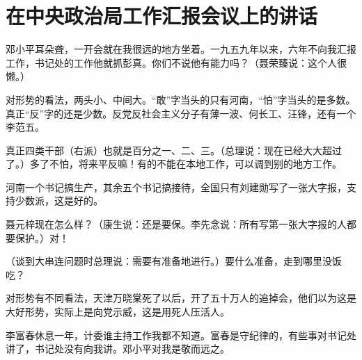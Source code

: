 \section[在中央政治局工作汇报会议上的讲话（一九六六年十月）]{在中央政治局工作汇报会议上的讲话}


邓小平耳朵聋，一开会就在我很远的地方坐着。一九五九年以来，六年不向我汇报工作，书记处的工作他就抓彭真。你们不说他有能力吗？（聂荣臻说：这个人很懒。）

对形势的看法，两头小、中间大。“敢”字当头的只有河南，“怕”字当头的是多数。真正“反”字的还是少数。反党反社会主义分子有薄一波、何长工、汪锋，还有一个李范五。

真正四类干部（右派）也就是百分之一、二、三。（总理说：现在已经大大超过了。）多了不怕，将来平反嘛！有的不能在本地工作，可以调到别的地方工作。

河南一个书记搞生产，其余五个书记搞接待，全国只有刘建勋写了一张大字报，支持少数派，这是好的。

聂元梓现在怎么样？（康生说：还是要保。李先念说：所有写第一张大字报的人都要保护。）对！

（谈到大串连问题时总理说：需要有准备地进行。）要什么准备，走到哪里没饭吃？

对形势有不同看法，天津万晓棠死了以后，开了五十万人的追掉会，他们以为这是大好形势，实际上是向党示威，这是用死人压活人。

李富春休息一年，计委谁主持工作我都不知道。富春是守纪律的，有些事对书记处讲了，书记处没有向我讲。邓小平对我是敬而远之。


